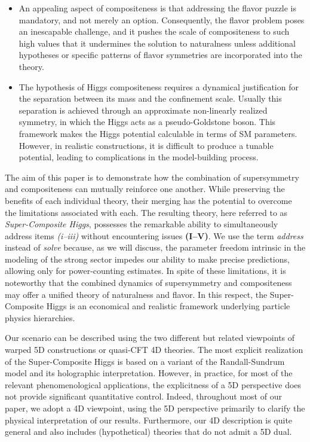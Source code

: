 \documentclass[a4paper,12pt]{article}
\begin{document}
\begin{itemize}

\item[\textbf{(IV)}] An appealing aspect of compositeness is that addressing the flavor puzzle is mandatory, and not merely an option. Consequently, the flavor problem poses an inescapable challenge, and it pushes the scale of compositeness to such high values that it undermines the solution to naturalness unless additional hypotheses or specific patterns of flavor symmetries are incorporated into the theory.

\item[\textbf{(V)}] The hypothesis of Higgs compositeness requires a dynamical justification for the separation between its mass and the confinement scale. Usually this separation is achieved through an approximate non-linearly realized symmetry, in which the Higgs acts as a pseudo-Goldstone boson. This framework makes the Higgs potential calculable in terms of SM parameters. However, in realistic constructions, it is difficult to produce a tunable potential, leading to complications in the model-building process.

\end{itemize}

The aim of this paper is to demonstrate how the combination of supersymmetry and compositeness can mutually reinforce one another. While preserving the benefits of each individual theory, their merging has the potential to overcome the limitations associated with each. The resulting theory, here referred to as {\it Super-Composite Higgs}, possesses the remarkable ability to simultaneously address items \textit{(i--iii)} without encountering issues \textbf{(I--V)}. We use the term \textit{address} instead of \textit{solve} because, as we will discuss, the parameter freedom intrinsic in the modeling of the strong sector
impedes our ability to make precise predictions, allowing only for power-counting estimates. In spite of these limitations, it is noteworthy that the combined dynamics of supersymmetry and compositeness may offer a unified theory of naturalness and flavor. In this respect, the Super-Composite Higgs is an economical and realistic framework underlying particle physics hierarchies.

Our scenario can be described using the two different but related viewpoints of warped 5D constructions or quasi-CFT 4D theories. The most explicit realization of the Super-Composite Higgs is based on a variant of the Randall-Sundrum model and its holographic interpretation. However, in practice, for most of the relevant phenomenological applications, the explicitness of a 5D perspective does not provide significant quantitative control. Indeed, throughout most of our paper, we adopt a 4D viewpoint, using the 5D perspective primarily to clarify the physical interpretation of our results. Furthermore, our 4D description is quite general and also includes (hypothetical) theories that do not admit a 5D dual.
\end{document}
